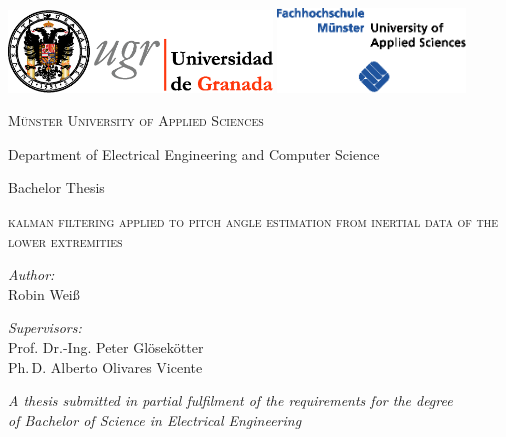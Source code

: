 \begin{titlepage}
\label{ch:titlepage}

\begin{center}

\includegraphics[width=7cm]{Figures/universidad_de_granada.eps}
	\hfill
\includegraphics[width=5cm]{Figures/fh-muenster.eps} 

\vspace{2.5cm}

{\large \textsc{Münster University of Applied Sciences}}

Department of Electrical Engineering and Computer Science

\vspace{1.5cm}

{\large Bachelor Thesis}

\vspace{0.8cm}

\begin{LARGE}
\textsc{kalman filtering applied to pitch angle estimation from inertial data of the lower extremities}
\end{LARGE}

\vspace{1.8cm}

\begin{minipage}{0.4\textwidth}
\begin{flushleft}
\emph{Author:} \\
Robin Weiß
\end{flushleft}
\end{minipage}
\hfill
\begin{minipage}{0.5\textwidth}
\begin{flushright}
\emph{Supervisors:} \\
Prof. Dr.-Ing. Peter Glösekötter \\
Ph.\,D. Alberto Olivares Vicente %
\end{flushright}
\end{minipage}

\vspace{2.0cm}
	
\textit{A thesis submitted in partial fulfilment of the requirements for the degree\\
of Bachelor of Science in Electrical Engineering}

\vfill

\monthname \: \the\year 

\end{center}

\end{titlepage}
